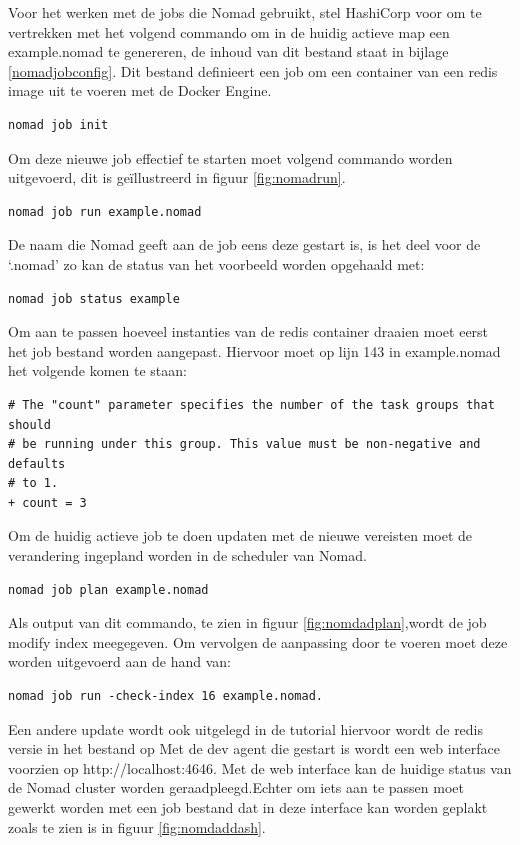 Voor het werken met de jobs die Nomad gebruikt, stel HashiCorp voor om te vertrekken met het volgend commando om in de huidig actieve map een example.nomad te genereren, de inhoud van dit bestand staat in bijlage \ref{nomadjobconfig}. Dit bestand definieert een job om een container van een redis image uit te voeren met de Docker Engine.
\begin{verbatim}
nomad job init
\end{verbatim}
Om deze nieuwe job effectief te starten moet volgend commando worden uitgevoerd, dit is geïllustreerd in figuur \ref{fig:nomadrun}.
\begin{verbatim}
nomad job run example.nomad
\end{verbatim}
De naam die Nomad geeft aan de job eens deze gestart is, is het deel voor de ‘.nomad’ zo kan de status van het voorbeeld worden opgehaald met:
\begin{verbatim}
nomad job status example
\end{verbatim}
Om aan te passen hoeveel instanties van de redis container draaien moet eerst het job bestand worden aangepast. Hiervoor moet op lijn 143 in example.nomad het volgende komen te staan:
\begin{verbatim}
# The "count" parameter specifies the number of the task groups that should
# be running under this group. This value must be non-negative and defaults
# to 1.
+ count = 3
\end{verbatim}
Om de huidig actieve job te doen updaten met de nieuwe vereisten moet de verandering ingepland worden in de scheduler van Nomad.
\begin{verbatim}
nomad job plan example.nomad
\end{verbatim}
Als output van dit commando, te zien in figuur \ref{fig:nomdadplan},wordt de job modify index meegegeven. Om vervolgen de aanpassing door te voeren moet deze worden uitgevoerd aan de hand van:
\begin{verbatim}
nomad job run -check-index 16 example.nomad.
\end{verbatim}
Een andere update wordt ook uitgelegd in de tutorial hiervoor wordt de redis versie in het bestand op Met de dev agent die gestart is wordt een web interface voorzien op http://localhost:4646. Met de web interface kan de huidige status van de Nomad cluster worden geraadpleegd.Echter om iets aan te passen moet gewerkt worden met een job bestand dat in deze interface kan worden geplakt zoals te zien is in figuur \ref{fig:nomdaddash}.


